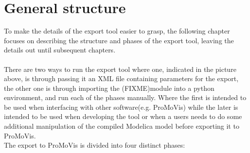 \documentclass{report}
\begin{document}
\section{General structure}
To make the details of the export tool easier to grasp, the following chapter focuses on describing the structure and phases of the export tool, leaving the details out until subsequent chapters.\\\newline
\setlength\fboxsep{0pt}
\setlength\fboxrule{0.5pt}
\\\newline There are two ways to run the export tool where one, indicated in the picture above, is through passing it an XML file containing parameters for the export, the other one is through importing the (FIXME)module into a python environment, and run each of the phases manually. Where the first is intended to be used when interfacing with other software(e.g. ProMoVis) while the later is intended to be used when developing the tool or when a users needs to do some additional manipulation of the compiled Modelica model before exporting it to ProMoVis.  \\\newline
The export to ProMoVis is divided into four distinct phases:
\end{document}

